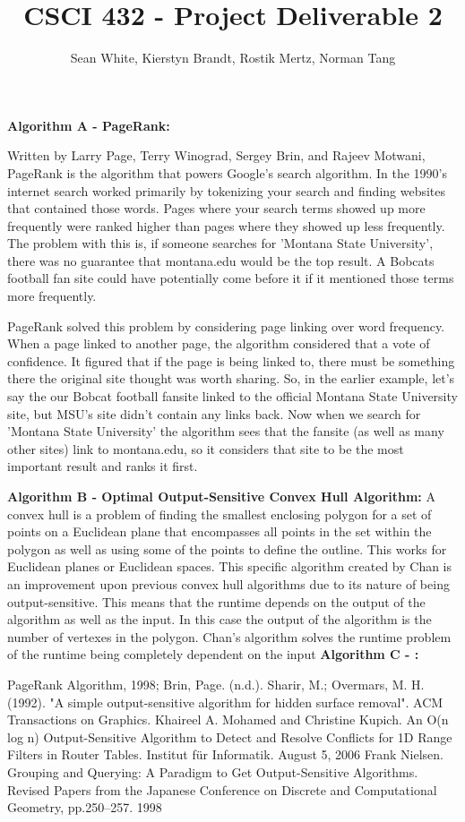 \documentclass[12pt]{article}
\author{Sean White, Kierstyn Brandt, Rostik Mertz, Norman Tang}
\title{CSCI 432 - Project Deliverable 2}
\begin{document}
\maketitle

\noindent
\textbf{Algorithm A - PageRank:}\smallskip

Written by Larry Page, Terry Winograd, Sergey Brin, and Rajeev Motwani, PageRank is the algorithm that powers Google's search algorithm. In the 1990's internet search worked primarily by tokenizing your search and finding websites that contained those words. Pages where your search terms showed up more frequently were ranked higher than pages where they showed up less frequently. The problem with this is, if someone searches for 'Montana State University', there was no guarantee that montana.edu would be the top result. A Bobcats football fan site could have potentially come before it if it mentioned those terms more frequently.

PageRank solved this problem by considering page linking over word frequency. When a page linked to another page, the algorithm considered that a vote of confidence. It figured that if the page is being linked to, there must be something there the original site thought was worth sharing. So, in the earlier example, let's say the our Bobcat football fansite linked to the official Montana State University site, but MSU's site didn't contain any links back. Now when we search for 'Montana State University' the algorithm sees that the fansite (as well as many other sites) link to montana.edu, so it considers that site to be the most important result and ranks it first.
\bigskip

\noindent
\textbf{Algorithm B - Optimal Output-Sensitive Convex Hull Algorithm:}\smallskip
A convex hull is a problem of finding the smallest enclosing polygon for a set of points on a Euclidean plane that encompasses all points in the set within the polygon as well as using some of the points to define the outline. This works for Euclidean planes or Euclidean spaces. This specific algorithm created by Chan is an improvement upon previous convex hull algorithms due to its nature of being output-sensitive. This means that the runtime depends on the output of the algorithm as well as the input. In this case the output of the algorithm is the number of vertexes in the polygon. Chan's algorithm solves the runtime problem of the runtime being completely dependent on the input
\bigskip
\noindent
\textbf{Algorithm C - :}\smallskip

\bigskip

PageRank Algorithm, 1998; Brin, Page. (n.d.).
Sharir, M.; Overmars, M. H. (1992). "A simple output-sensitive algorithm for hidden surface removal". ACM Transactions on Graphics.
 Khaireel A. Mohamed and Christine Kupich. An O(n log n) Output-Sensitive Algorithm to Detect and Resolve Conflicts for 1D Range Filters in Router Tables. Institut für Informatik. August 5, 2006
  Frank Nielsen. Grouping and Querying: A Paradigm to Get Output-Sensitive Algorithms. Revised Papers from the Japanese Conference on Discrete and Computational Geometry, pp.250–257. 1998
  
\end{document}
